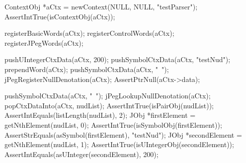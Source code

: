 
\startCTest
  ContextObj *aCtx = newContext(NULL, NULL, "testParser");
  AssertIntTrue(isContextObj(aCtx));
  
  registerBasicWords(aCtx);
  registerControlWords(aCtx);
  registerJPegWords(aCtx);
  
  pushUIntegerCtxData(aCtx, 200);
  pushSymbolCtxData(aCtx, "testNud");
  prependWord(aCtx);
  pushSymbolCtxData(aCtx, "~");
  jPegRegisterNullDenotation(aCtx);
  AssertPtrNull(aCtx->data);
  
  pushSymbolCtxData(aCtx, "~");
  jPegLookupNullDenotation(aCtx);
  popCtxDataInto(aCtx, nudList);
  AssertIntTrue(isPairObj(nudList));
  AssertIntEquals(listLength(nudList), 2);
  JObj *firstElement = getNthElement(nudList, 0);
  AssertIntTrue(isSymbolObj(firstElement));
  AssertStrEquals(asSymbol(firstElement), "testNud");
  JObj *secondElement = getNthElement(nudList, 1);
  AssertIntTrue(isUIntegerObj(secondElement));
  AssertIntEquals(asUInteger(secondElement), 200);
\stopCTest
\stopTestCase
\stopTestSuite
